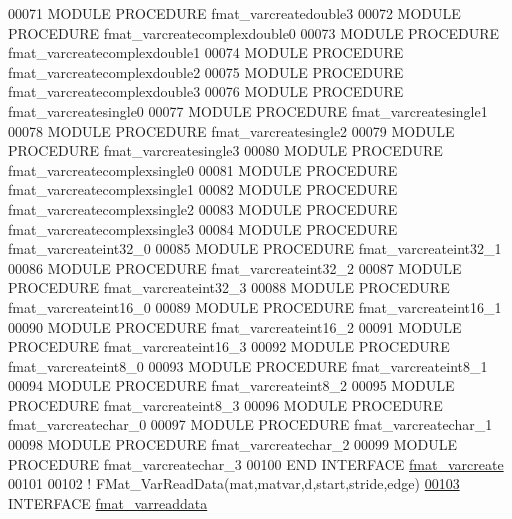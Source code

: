 \begin{DoxyCode}
00071         \textcolor{keyword}{MODULE PROCEDURE} fmat\_varcreatedouble3
00072         \textcolor{keyword}{MODULE PROCEDURE} fmat\_varcreatecomplexdouble0
00073         \textcolor{keyword}{MODULE PROCEDURE} fmat\_varcreatecomplexdouble1
00074         \textcolor{keyword}{MODULE PROCEDURE} fmat\_varcreatecomplexdouble2
00075         \textcolor{keyword}{MODULE PROCEDURE} fmat\_varcreatecomplexdouble3
00076         \textcolor{keyword}{MODULE PROCEDURE} fmat\_varcreatesingle0
00077         \textcolor{keyword}{MODULE PROCEDURE} fmat\_varcreatesingle1
00078         \textcolor{keyword}{MODULE PROCEDURE} fmat\_varcreatesingle2
00079         \textcolor{keyword}{MODULE PROCEDURE} fmat\_varcreatesingle3
00080         \textcolor{keyword}{MODULE PROCEDURE} fmat\_varcreatecomplexsingle0
00081         \textcolor{keyword}{MODULE PROCEDURE} fmat\_varcreatecomplexsingle1
00082         \textcolor{keyword}{MODULE PROCEDURE} fmat\_varcreatecomplexsingle2
00083         \textcolor{keyword}{MODULE PROCEDURE} fmat\_varcreatecomplexsingle3
00084         \textcolor{keyword}{MODULE PROCEDURE} fmat\_varcreateint32\_0
00085         \textcolor{keyword}{MODULE PROCEDURE} fmat\_varcreateint32\_1
00086         \textcolor{keyword}{MODULE PROCEDURE} fmat\_varcreateint32\_2
00087         \textcolor{keyword}{MODULE PROCEDURE} fmat\_varcreateint32\_3
00088         \textcolor{keyword}{MODULE PROCEDURE} fmat\_varcreateint16\_0
00089         \textcolor{keyword}{MODULE PROCEDURE} fmat\_varcreateint16\_1
00090         \textcolor{keyword}{MODULE PROCEDURE} fmat\_varcreateint16\_2
00091         \textcolor{keyword}{MODULE PROCEDURE} fmat\_varcreateint16\_3
00092         \textcolor{keyword}{MODULE PROCEDURE} fmat\_varcreateint8\_0
00093         \textcolor{keyword}{MODULE PROCEDURE} fmat\_varcreateint8\_1
00094         \textcolor{keyword}{MODULE PROCEDURE} fmat\_varcreateint8\_2
00095         \textcolor{keyword}{MODULE PROCEDURE} fmat\_varcreateint8\_3
00096         \textcolor{keyword}{MODULE PROCEDURE} fmat\_varcreatechar\_0
00097         \textcolor{keyword}{MODULE PROCEDURE} fmat\_varcreatechar\_1
00098         \textcolor{keyword}{MODULE PROCEDURE} fmat\_varcreatechar\_2
00099         \textcolor{keyword}{MODULE PROCEDURE} fmat\_varcreatechar\_3
00100 \textcolor{keyword}{    END INTERFACE }\hyperlink{interfacematio_1_1fmat__varcreate}{fmat\_varcreate}
00101 
00102     \textcolor{comment}{! FMat\_VarReadData(mat,matvar,d,start,stride,edge)}
\hyperlink{interfacematio_1_1fmat__varreaddata}{00103}     \textcolor{keyword}{INTERFACE} \hyperlink{interfacematio_1_1fmat__varreaddata}{fmat\_varreaddata}

\end{DoxyCode}
